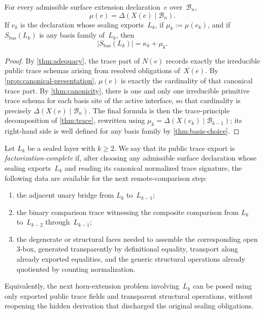 \documentclass{lmcs}
\newcommand{\B}{\mathcal{B}}
\begin{document}
\begin{cor}
\label{cor:mu-delta}
For every admissible surface extension declaration~$e$ over~$\B_n$,
\[
  \mu(e) = \Delta(X(e)\mid\B_n).
\]
If $e_k$ is the declaration whose sealing exports~$L_k$, if $\mu_k := \mu(e_k)$,
and if $S_{\mathrm{bas}}(L_k)$ is any basis family of~$L_k$, then
\[
  |S_{\mathrm{bas}}(L_k)| = \kappa_k + \mu_k.
\]
\end{cor}

\begin{proof}
By \autoref{thm:adequacy}, the trace part of $N(e)$ records exactly the
irreducible public trace schemas arising from resolved obligations of~$X(e)$.
By \autoref{prop:canonical-presentation}, $\mu(e)$ is exactly the cardinality
of that canonical trace part. By \autoref{thm:canonicity}, there is one and
only one irreducible primitive trace schema for each basis site of the active
interface, so that cardinality is precisely $\Delta(X(e)\mid\B_n)$. The final
formula is then the trace-principle decomposition of \autoref{thm:trace},
rewritten using $\mu_k=\Delta(X(e_k)\mid\B_{k-1})$; its right-hand side is
well defined for any basis family by \autoref{thm:basis-choice}.
\end{proof}

\begin{defi}
\label{def:factorization-complete}
Let $L_k$ be a sealed layer with $k \geq 2$. We say that its public trace
export is \emph{factorization-complete} if, after choosing any admissible
surface declaration whose sealing exports~$L_k$ and reading its canonical
normalized trace signature, the following data are available for the next
remote-comparison step:
\begin{enumerate}
  \item the adjacent unary bridge from $L_k$ to~$L_{k-1}$;
  \item the binary comparison trace witnessing the composite comparison from
  $L_k$ to~$L_{k-2}$ through~$L_{k-1}$;
  \item the degenerate or structural faces needed to assemble the corresponding
  open $3$-box, generated transparently by definitional equality, transport
  along already exported equalities, and the generic structural operations
  already quotiented by counting normalization.
\end{enumerate}
Equivalently, the next horn-extension problem involving~$L_k$ can be posed
using only exported public trace fields and transparent structural operations,
without reopening the hidden derivation that discharged the original sealing
obligations.
\end{defi}
\end{document}

